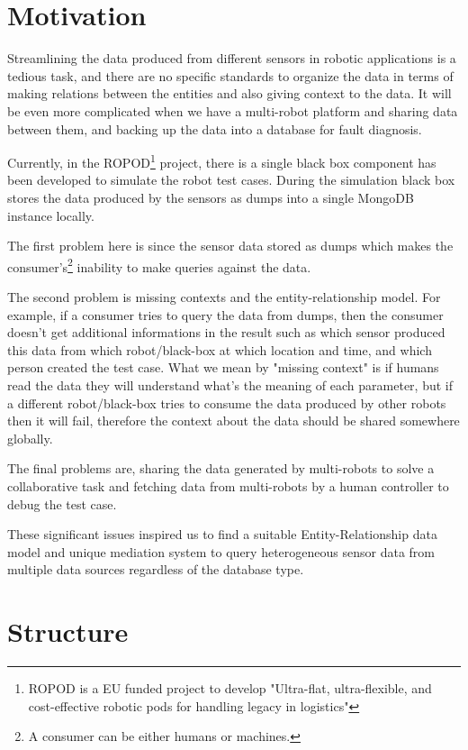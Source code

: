     \section{Motivation}
    
Streamlining the data produced from different sensors in robotic applications is a tedious task, and there are no specific standards to organize the data in terms of making relations between the entities and also giving context to the data. It will be even more complicated when we have a multi-robot platform and sharing data between them, and backing up the data into a database for fault diagnosis.

Currently, in the ROPOD\footnote{ROPOD is a EU funded project to develop "Ultra-flat, ultra-flexible, and cost-effective robotic pods for handling legacy in logistics"} project, there is a single black box component has been developed to simulate the robot test cases. During the simulation black box stores the data produced by the sensors as dumps into a single MongoDB instance locally.  

The first problem here is since the sensor data stored as dumps which makes the consumer's\footnote{A consumer can be either humans or machines.} inability to make queries against the data. 

The second problem is missing contexts and the entity-relationship model. For example, if a consumer tries to query the data from dumps, then the consumer doesn't get additional informations in the result such as which sensor produced this data from which robot/black-box at which location and time, and which person created the test case. What we mean by "missing context" is if humans read the data they will understand what's the meaning of each parameter, but if a different robot/black-box tries to consume the data produced by other robots then it will fail, therefore the context about the data should be shared somewhere globally.


The final problems are, sharing the data generated by multi-robots to solve a collaborative task and fetching data from multi-robots by a human controller to debug the test case.


These significant issues inspired us to find a suitable Entity-Relationship data model and unique mediation system to query heterogeneous sensor data from multiple data sources regardless of the database type.


    \section{Structure}
	
